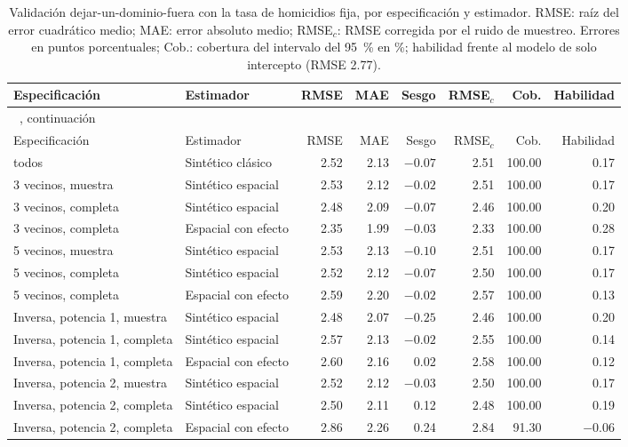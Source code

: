 {\footnotesize\setlength{\tabcolsep}{3pt}
\begin{longtable}{p{3.2cm} l r r r r r r}
\caption[Validación del Fay-Herriot espacial por especificación]{Validación dejar-un-dominio-fuera con la tasa de homicidios fija, por especificación y estimador. RMSE: raíz del error cuadrático medio; MAE: error absoluto medio; RMSE$_c$: RMSE corregida por el ruido de muestreo. Errores en puntos porcentuales; Cob.: cobertura del intervalo del 95~\% en \%; habilidad frente al modelo de solo intercepto (RMSE 2.77).}
\label{tab:app_espacial_validacion} \\
\toprule
Especificación & Estimador & RMSE & MAE & Sesgo & RMSE$_c$ & Cob. & Habilidad \\
\midrule
\endfirsthead
\multicolumn{8}{l}{\tablename~\thetable{}, continuación} \\
\toprule
Especificación & Estimador & RMSE & MAE & Sesgo & RMSE$_c$ & Cob. & Habilidad \\
\midrule
\endhead
\bottomrule
\endlastfoot
todos & Sintético clásico & 2.52 & 2.13 & $-0.07$ & 2.51 & 100.00 & 0.17 \\
3 vecinos, muestra & Sintético espacial & 2.53 & 2.12 & $-0.02$ & 2.51 & 100.00 & 0.17 \\
3 vecinos, completa & Sintético espacial & 2.48 & 2.09 & $-0.07$ & 2.46 & 100.00 & 0.20 \\
3 vecinos, completa & Espacial con efecto & 2.35 & 1.99 & $-0.03$ & 2.33 & 100.00 & 0.28 \\
5 vecinos, muestra & Sintético espacial & 2.53 & 2.13 & $-0.10$ & 2.51 & 100.00 & 0.17 \\
5 vecinos, completa & Sintético espacial & 2.52 & 2.12 & $-0.07$ & 2.50 & 100.00 & 0.17 \\
5 vecinos, completa & Espacial con efecto & 2.59 & 2.20 & $-0.02$ & 2.57 & 100.00 & 0.13 \\
Inversa, potencia 1, muestra & Sintético espacial & 2.48 & 2.07 & $-0.25$ & 2.46 & 100.00 & 0.20 \\
Inversa, potencia 1, completa & Sintético espacial & 2.57 & 2.13 & $-0.02$ & 2.55 & 100.00 & 0.14 \\
Inversa, potencia 1, completa & Espacial con efecto & 2.60 & 2.16 & 0.02 & 2.58 & 100.00 & 0.12 \\
Inversa, potencia 2, muestra & Sintético espacial & 2.52 & 2.12 & $-0.03$ & 2.50 & 100.00 & 0.17 \\
Inversa, potencia 2, completa & Sintético espacial & 2.50 & 2.11 & 0.12 & 2.48 & 100.00 & 0.19 \\
Inversa, potencia 2, completa & Espacial con efecto & 2.86 & 2.26 & 0.24 & 2.84 & 91.30 & $-0.06$ \\
\end{longtable}
}
